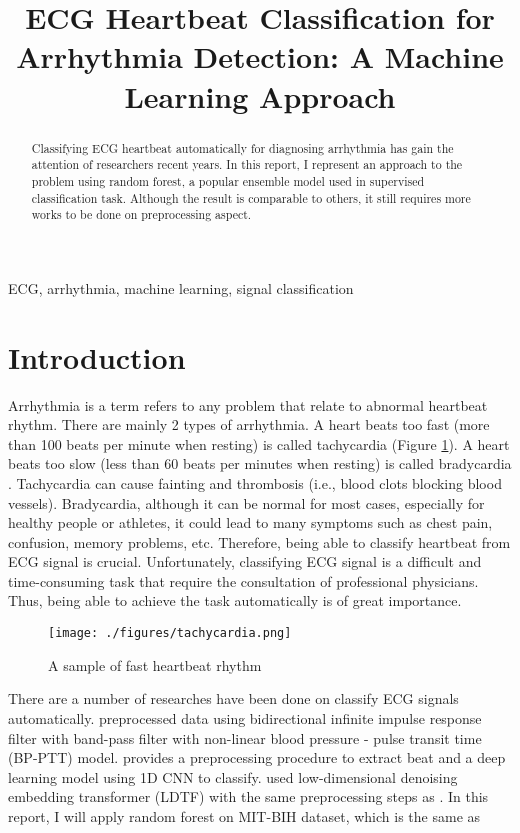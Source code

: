 \documentclass[conference]{IEEEtran}
\title{ECG Heartbeat Classification for Arrhythmia Detection: A Machine Learning Approach}
\author{
	\IEEEauthorblockN{Nguyen Hai Dang - 22BI13073}
	\IEEEauthorblockA{
		\textit{Department of Information and Communication Technology} \\ 
		\textit{University of Science and Technology of Hanoi} \\ 
	}
}
\begin{document}
	\maketitle
	\begin{abstract}	
		Classifying ECG heartbeat automatically for diagnosing arrhythmia has gain the attention of researchers recent years. In this report, I represent an approach to the problem using random forest, a popular ensemble model used in supervised classification task. Although the result is comparable to others, it still requires more works to be done on preprocessing aspect. 
	\end{abstract}
	
	\begin{IEEEkeywords}
		ECG, arrhythmia, machine learning, signal classification
	\end{IEEEkeywords}
	
	\section{Introduction}
	
	Arrhythmia is a term refers to any problem that relate to abnormal heartbeat rhythm. There are mainly 2 types of arrhythmia. A heart beats too fast (more than 100 beats per minute when resting) is called tachycardia \cite{tachycardia} (Figure \ref{fig:fast}). A heart beats too slow (less than 60 beats per minutes when resting) is called bradycardia \cite{bradycardia}. Tachycardia can cause fainting and thrombosis (i.e., blood clots blocking blood vessels). Bradycardia, although it can be normal for most cases, especially for healthy people or athletes, it could lead to many symptoms such as chest pain, confusion, memory problems, etc. Therefore, being able to classify heartbeat from ECG signal is crucial. Unfortunately, classifying ECG signal is a difficult and time-consuming task that require the consultation of professional physicians. Thus, being able to achieve the task automatically is of great importance. 
	
	\begin{figure}[h]
		\centering
		\texttt{[image: ./figures/tachycardia.png]}
		\label{fig:fast}
		\caption{A sample of fast heartbeat rhythm}
	\end{figure}
	
	There are a number of researches have been done on classify ECG signals automatically. \cite{esmaili} preprocessed data using bidirectional infinite impulse response filter with band-pass filter with non-linear blood pressure - pulse transit time (BP-PTT) model. \cite{kachuee} provides a preprocessing procedure to extract beat and a deep learning model using 1D CNN to classify. \cite{guan} used low-dimensional denoising embedding transformer (LDTF) with the same preprocessing steps as \cite{kachuee}. In this report, I will apply random forest on MIT-BIH dataset, which is the same as \cite{kachuee, guan}
	
\end{document}
